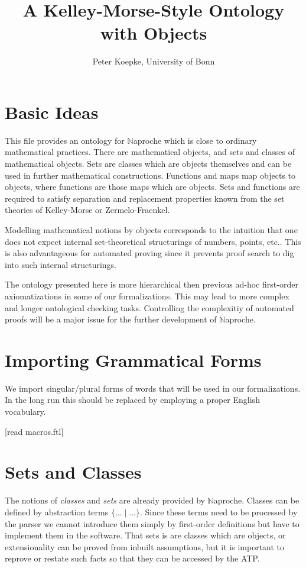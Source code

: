 \documentclass[11pt]{article}
\author{Peter Koepke, University of Bonn}
\title{A Kelley-Morse-Style Ontology with Objects}
\begin{document}
\newcommand{\val}[2]{#1_{#2}}
\newcommand{\Prod}[3]{#1_{#2} \cdots #1_{#3}}
\newcommand{\Seq}[2]{\{#1,\dots,#2\}}
\newcommand{\FinSet}[3]{\{#1_{#2},\dots,#1_{#3}\}}
\newcommand{\Primes}{\mathbb{P}}
\newcommand{\Naproche}{$\mathbb{N}$aproche}

\maketitle

\section{Basic Ideas}

This file provides an ontology for $\mathbb{N}$aproche which
is close to ordinary mathematical practices. There are
mathematical objects, and sets and classes of mathematical
objects. Sets are classes which are objects themselves and
can be used in further mathematical constructions. Functions
and maps map objects to objects, where functions are those
maps which are objects. Sets and functions are required to
satisfy separation and replacement properties known from the
set theories of Kelley-Morse or Zermelo-Fraenkel.

Modelling mathematical notions by objects corresponds
to the intuition that one does not expect internal set-theoretical
structurings of numbers, points, etc.. This is also advantageous
for automated proving since it prevents proof search to
dig into such internal structurings.

The ontology presented here is more hierarchical then previous
ad-hoc first-order axiomatizations in some of our formalizations. This
may lead to more complex and longer ontological checking tasks.
Controlling the complexitiy of automated proofs will be a major
issue for the further development of $\mathbb{N}$aproche.

\section{Importing Grammatical Forms}
We import singular/plural forms of words that will be used in
our formalizations. In the long run this should be replaced by
employing a proper English vocabulary.

\begin{forthel}

[read macros.ftl]
\end{forthel}

\section{Sets and Classes}
The notions of \textit{classes} and \textit{sets} are already
provided by $\mathbb{N}$aproche. Classes can be defined by
abstraction terms $\{\dots\mid\dots\}$. Since these terms need to be
processed by the parser we cannot introduce them simply by first-order
definitions but have to implement them in the software.
That sets is are classes which are objects, or extensionality can be proved
from inbuilt assumptions, but it is important to reprove or restate such
facts so that they can be accessed by the ATP.
\end{document}
